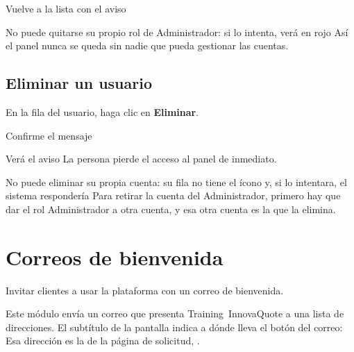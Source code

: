 \begin{resultado}
Vuelve a la lista con el aviso 
\end{resultado}

\begin{nota}
No puede quitarse su propio rol de Administrador: si lo intenta, verá en rojo  Así el panel nunca se queda sin nadie que pueda
gestionar las cuentas.
\end{nota}

\subsection{Eliminar un usuario}

\begin{pasos}
  \item En la fila del usuario, haga clic en \icono[error]{\icEliminar} \textbf{Eliminar}.
  \item Confirme el mensaje 
\end{pasos}

Verá el aviso  La persona pierde el acceso al panel de
inmediato.

\begin{nota}
No puede eliminar su propia cuenta: su fila no tiene el ícono y, si lo intentara, el sistema
respondería  Para retirar la cuenta del
Administrador, primero hay que dar el rol Administrador a otra cuenta, y esa otra cuenta es la
que la elimina.
\end{nota}

\section{Correos de bienvenida}\label{sec:bienvenida}

  {Invitar clientes a usar la plataforma con un correo de bienvenida.}

Este módulo envía un correo que presenta Training~InnovaQuote a una lista de direcciones. El subtítulo de
la pantalla indica a dónde lleva el botón del correo:  Esa dirección es la de la página de solicitud, .

